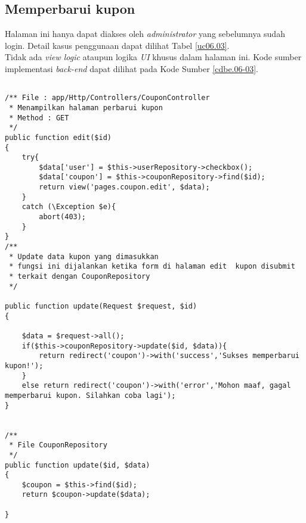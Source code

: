 \subsection{Memperbarui kupon}
Halaman ini hanya dapat diakses oleh \textit{administrator} yang sebelumnya sudah login. Detail kasus penggunaan dapat dilihat Tabel \ref{uc06.03}.\\
\indent Tidak ada \textit{view logic} ataupun logika \textit{UI} khusus dalam halaman ini. Kode sumber implementasi \textit{back-end} dapat dilihat pada Kode Sumber \ref{cdbe.06-03}.

\begin{lstlisting}[label=cdbe.06-03,style=php,caption=Kode Sumber Implementasi \textit{Back-end} Kasus Penggunaan Memperbarui kupon]

/** File : app/Http/Controllers/CouponController
 * Menampilkan halaman perbarui kupon
 * Method : GET
 */
public function edit($id)
{
    try{
        $data['user'] = $this->userRepository->checkbox();
        $data['coupon'] = $this->couponRepository->find($id);
        return view('pages.coupon.edit', $data);
    }
    catch (\Exception $e){
        abort(403);
    }
}
/**
 * Update data kupon yang dimasukkan
 * fungsi ini dijalankan ketika form di halaman edit  kupon disubmit
 * terkait dengan CouponRepository
 */

public function update(Request $request, $id)
{

    $data = $request->all();
    if($this->couponRepository->update($id, $data)){
        return redirect('coupon')->with('success','Sukses memperbarui kupon!');
    }
    else return redirect('coupon')->with('error','Mohon maaf, gagal memperbarui kupon. Silahkan coba lagi');
}


/**
 * File CouponRepository
 */
public function update($id, $data)
{
    $coupon = $this->find($id);
    return $coupon->update($data);

}
\end{lstlisting}
	  
      
